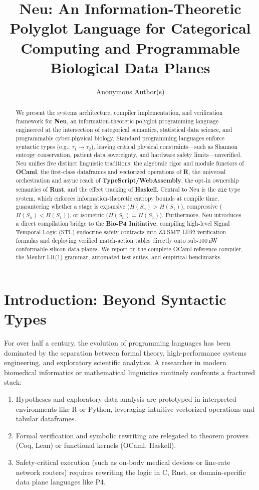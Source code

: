 \documentclass[11pt]{article}
\title{\textbf{Neu: An Information-Theoretic Polyglot Language for Categorical Computing and Programmable Biological Data Planes}}
\author{Anonymous Author(s)}
\date{}
\begin{document}
\maketitle

\begin{abstract}
We present the systems architecture, compiler implementation, and verification framework for \textbf{Neu}, an information-theoretic polyglot programming language engineered at the intersection of categorical semantics, statistical data science, and programmable cyber-physical biology. Standard programming languages enforce syntactic types (e.g., $\tau_1 \to \tau_2$), leaving critical physical constraints---such as Shannon entropy conservation, patient data sovereignty, and hardware safety limits---unverified. Neu unifies five distinct linguistic traditions: the algebraic rigor and module functors of \textbf{OCaml}, the first-class dataframes and vectorized operations of \textbf{R}, the universal orchestration and async reach of \textbf{TypeScript/WebAssembly}, the opt-in ownership semantics of \textbf{Rust}, and the effect tracking of \textbf{Haskell}. Central to Neu is the \texttt{aie} type system, which enforces information-theoretic entropy bounds at compile time, guaranteeing whether a stage is expansive ($H(S_n) > H(S_1)$), compressive ($H(S_n) < H(S_1)$), or isometric ($H(S_n) = H(S_1)$). Furthermore, Neu introduces a direct compilation bridge to the \textbf{Bio-P4 Initiative}, compiling high-level Signal Temporal Logic (STL) endocrine safety contracts into Z3 SMT-LIB2 verification formulas and deploying verified match-action tables directly onto sub-100\,nW conformable silicon data planes. We report on the complete OCaml reference compiler, the Menhir LR(1) grammar, automated test suites, and empirical benchmarks.
\end{abstract}

\section{Introduction: Beyond Syntactic Types}

For over half a century, the evolution of programming languages has been dominated by the separation between formal theory, high-performance systems engineering, and exploratory scientific analytics. A researcher in modern biomedical informatics or mathematical linguistics routinely confronts a fractured stack:
\begin{enumerate}
    \item Hypotheses and exploratory data analysis are prototyped in interpreted environments like R or Python, leveraging intuitive vectorized operations and tabular dataframes.
    \item Formal verification and symbolic rewriting are relegated to theorem provers (Coq, Lean) or functional kernels (OCaml, Haskell).
    \item Safety-critical execution (such as on-body medical devices or line-rate network routers) requires rewriting the logic in C, Rust, or domain-specific data plane languages like P4.
\end{enumerate}
\end{document}

